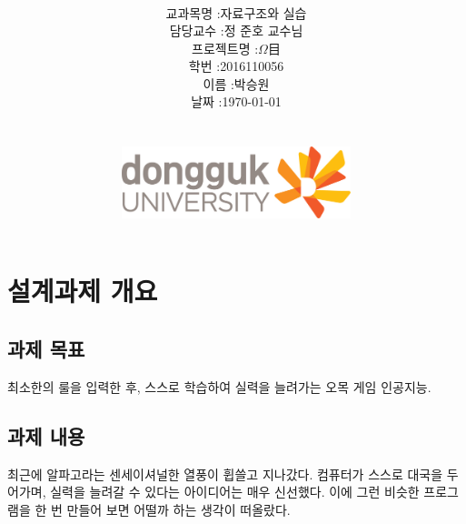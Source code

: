 \documentclass[12pt,a4paper]{report}
\title{
	\centering
	\pgfornament[width=12cm,color=teal]{84}\\
	\vspace{1cm}
	\fontsize{50}{50} \selectfont {오목 인공지능 형성\\설계과제 수행 계획서}\\
		\pgfornament[width=12cm,color=teal]{88}\\
	\vfill}
\author{
	\LARGE
	\begin{tabular}{rl}
		\hline
		교과목명 : & 자료구조와 실습\\
		담당교수 : & 정 준호 교수님\\
		프로젝트명 : & $\Omega$目\\
		학번 : & 2016110056\\ 
		이름 : & 박승원\\
		날짜 : & \today\\
		\hline
		\vspace{1cm}
	\end{tabular}
\\	
\includegraphics[width=0.5\textwidth]{logo.jpg}
	}
\date{}
\begin{document}
\lstset{language=C, columns=flexible, tabsize=4, frame=shadowbox, showstringspaces=false, breaklines=true, upquote=true, basicstyle=\ttfamily}

\maketitle


\newpage
\tableofcontents

\noindent
\chapter{설계과제 개요}

\section{과제 목표}
최소한의 룰을 입력한 후, 스스로 학습하여 실력을 늘려가는 오목 게임 인공지능.
\section{과제 내용}
최근에 알파고라는 센세이셔널한 열풍이 휩쓸고 지나갔다. 
컴퓨터가 스스로 대국을 두어가며, 실력을 늘려갈 수 있다는 아이디어는 매우 신선했다.
이에 그런 비슷한 프로그램을 한 번 만들어 보면 어떨까 하는 생각이 떠올랐다.
\end{document}
